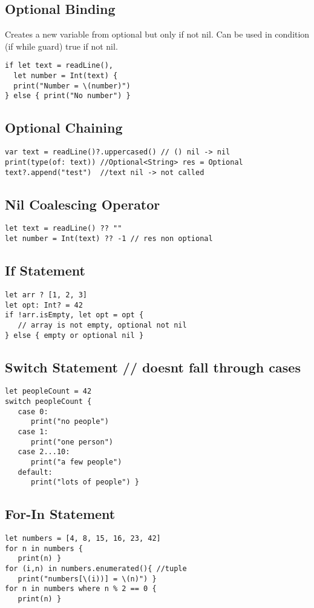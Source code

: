 \subsection{Optional Binding}
Creates a new variable from optional but only if not nil. Can be used in condition (if while guard) true if not nil.
\begin{lstlisting}
if let text = readLine(),
  let number = Int(text) {
  print("Number = \(number)")
} else { print("No number") }
\end{lstlisting}

\subsection{Optional Chaining}
\begin{lstlisting}
var text = readLine()?.uppercased() // () nil -> nil
print(type(of: text)) //Optional<String> res = Optional
text?.append("test")  //text nil -> not called
\end{lstlisting}

\subsection{Nil Coalescing Operator}
\begin{lstlisting}
let text = readLine() ?? ""
let number = Int(text) ?? -1 // res non optional
\end{lstlisting}

\subsection{If Statement}
\begin{lstlisting}
let arr ? [1, 2, 3]
let opt: Int? = 42
if !arr.isEmpty, let opt = opt {
   // array is not empty, optional not nil
} else { empty or optional nil }
\end{lstlisting}

\subsection{Switch Statement // doesnt fall through cases}
\begin{lstlisting}
let peopleCount = 42
switch peopleCount {
   case 0:
      print("no people")
   case 1:
      print("one person")
   case 2...10:
      print("a few people")
   default:
      print("lots of people") }
\end{lstlisting}

\subsection{For-In Statement}
\begin{lstlisting}
let numbers = [4, 8, 15, 16, 23, 42]
for n in numbers {
   print(n) }
for (i,n) in numbers.enumerated(){ //tuple
   print("numbers[\(i))] = \(n)") }
for n in numbers where n % 2 == 0 {
   print(n) }
\end{lstlisting}

